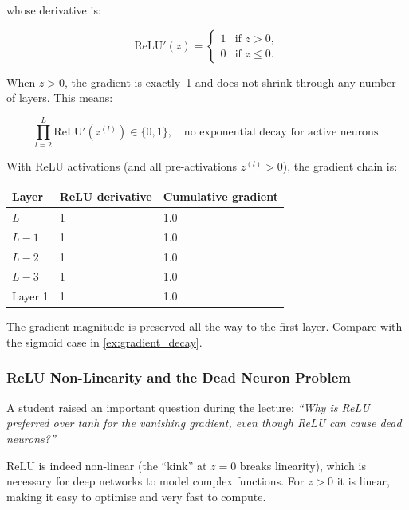\documentclass[12pt,a4paper]{article}
\newcommand{\relu}{\mathrm{ReLU}}
\begin{document}
whose derivative is:

\begin{equation}
  \relu'(z) =
  \begin{cases}
    1 & \text{if } z > 0, \\
    0 & \text{if } z \leq 0.
  \end{cases}
  \label{eq:relu_deriv}
\end{equation}

When $z > 0$, the gradient is exactly~1 and does not shrink through
any number of layers.  This means:

\begin{equation}
  \prod_{l=2}^{L} \relu'(z^{(l)}) \in \{0, 1\},
  \quad\text{no exponential decay for active neurons.}
  \label{eq:relu_product}
\end{equation}

\begin{example}[title=ReLU Gradient Does Not Vanish]
\label{ex:relu_gradient}
With ReLU activations (and all pre-activations $z^{(l)} > 0$), the
gradient chain is:
\begin{center}
\begin{tabular}{@{}lll@{}}
\toprule
\textbf{Layer} & \textbf{ReLU derivative} & \textbf{Cumulative gradient} \\
\midrule
$L$   & 1 & 1.0 \\
$L-1$ & 1 & 1.0 \\
$L-2$ & 1 & 1.0 \\
$L-3$ & 1 & 1.0 \\
Layer 1 & 1 & 1.0 \\
\bottomrule
\end{tabular}
\end{center}
The gradient magnitude is preserved all the way to the first layer.
Compare with the sigmoid case in \cref{ex:gradient_decay}.
\end{example}

\subsubsection{ReLU Non-Linearity and the Dead Neuron Problem}
\label{subsubsec:dead_neuron}

A student raised an important question during the lecture: \emph{``Why
is ReLU preferred over tanh for the vanishing gradient, even though
ReLU can cause dead neurons?''}

ReLU is indeed non-linear (the ``kink'' at $z = 0$ breaks linearity),
which is necessary for deep networks to model complex functions.  For
$z > 0$ it is linear, making it easy to optimise and very fast to
compute.
\end{document}

